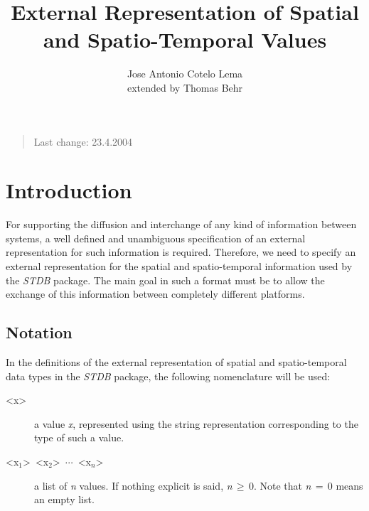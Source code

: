 \documentclass[english,a4paper]{article}
\begin{document}
\title{External Representation of Spatial and Spatio-Temporal Values}


\author{Jose Antonio Cotelo Lema \\{\small extended by Thomas Behr}}

\maketitle
\begin{quote}
\begin{center}Last change: 23.4.2004\end{center}
\end{quote}

\section{Introduction}

For supporting the diffusion and interchange of any kind of information
between systems, a well defined and unambiguous specification of an
external representation for such information is required. Therefore,
we need to specify an external representation for the spatial and
spatio-temporal information used by the \emph{STDB} package. The main
goal in such a format must be to allow the exchange of this information
between completely different platforms.


\subsection{Notation}

In the definitions of the external representation of spatial and spatio-temporal
data types in the \emph{STDB} package, the following nomenclature
will be used:

\begin{description}
\item [<x>]a value \emph{x}, represented using the string representation
corresponding to the type of such a value.
\item [<x$_{1}$>~<x$_{2}$>~$\cdots $~<x$_{n}$>]a list of \emph{n}
values. If nothing explicit is said, \emph{n}$\, \geq \, $0. Note
that \emph{n}$\, =\, $0 means an empty list.
\end{description}
\end{document}
